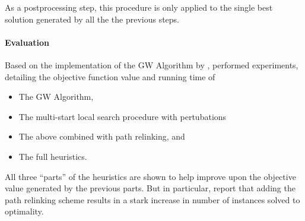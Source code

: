  As a postprocessing step, this procedure is only applied to the single best solution generated
  by all the the previous steps.
\paragraph{Evaluation}
Based on the implementation of the GW Algorithm by \cite{Johnson:2000:PCS:338219.338637},
\cite{canuto2001local} performed experiments, detailing the objective function value
and running time of
\begin{itemize}
\item The GW Algorithm,
\item The multi-start local search procedure with pertubations
\item The above combined with path relinking, and
\item The full heuristics.
\end{itemize}

All three ``parts'' of the heuristics are shown to help improve upon the
objective value generated by the previous parts.
But in particular, \citeauthor{canuto2001local} report that adding the
path relinking scheme results in a stark increase
 in number of instances solved to optimality.


